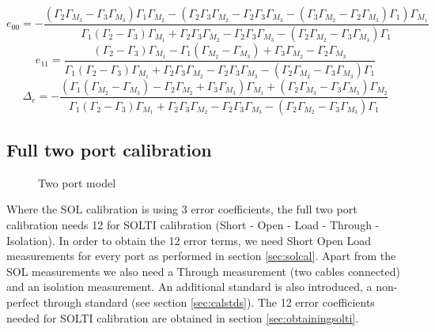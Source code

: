 	\small
	\begin{equation}
	\label{eqn:e00}
		e_{00} = -\frac{{\left(\Gamma_{2} \Gamma_{M_{3}} - \Gamma_{3} \Gamma_{M_{3}}\right)} \Gamma_{1} \Gamma_{M_{2}} - {\left(\Gamma_{2} \Gamma_{3} \Gamma_{M_{2}} - \Gamma_{2} \Gamma_{3} \Gamma_{M_{3}} - {\left(\Gamma_{3} \Gamma_{M_{2}} - \Gamma_{2} \Gamma_{M_{3}}\right)} \Gamma_{1}\right)} \Gamma_{M_{1}}}{\Gamma_{1} {\left(\Gamma_{2} - \Gamma_{3}\right)} \Gamma_{M_{1}} + \Gamma_{2} \Gamma_{3} \Gamma_{M_{2}} - \Gamma_{2} \Gamma_{3} \Gamma_{M_{3}} - {\left(\Gamma_{2} \Gamma_{M_{2}} - \Gamma_{3} \Gamma_{M_{3}}\right)} \Gamma_{1}}		
	\end{equation}
	\begin{equation}
	\label{eqn:e11}
	e_{11} = \frac{{\left(\Gamma_{2} - \Gamma_{3}\right)} \Gamma_{M_{1}} - \Gamma_{1} {\left(\Gamma_{M_{2}} - \Gamma_{M_{3}}\right)} + \Gamma_{3} \Gamma_{M_{2}} - \Gamma_{2} \Gamma_{M_{3}}}{\Gamma_{1} {\left(\Gamma_{2} - \Gamma_{3}\right)} \Gamma_{M_{1}} + \Gamma_{2} \Gamma_{3} \Gamma_{M_{2}} - \Gamma_{2} \Gamma_{3} \Gamma_{M_{3}} - {\left(\Gamma_{2} \Gamma_{M_{2}} - \Gamma_{3} \Gamma_{M_{3}}\right)} \Gamma_{1}}
	\end{equation}
	\begin{equation}
	\label{eqn:deltae}
	 \Delta_{e} = -\frac{{\left(\Gamma_{1} {\left(\Gamma_{M_{2}} - \Gamma_{M_{3}}\right)} - \Gamma_{2} \Gamma_{M_{2}} + \Gamma_{3} \Gamma_{M_{3}}\right)} \Gamma_{M_{1}} + {\left(\Gamma_{2} \Gamma_{M_{3}} - \Gamma_{3} \Gamma_{M_{3}}\right)} \Gamma_{M_{2}}}{\Gamma_{1} {\left(\Gamma_{2} - \Gamma_{3}\right)} \Gamma_{M_{1}} + \Gamma_{2} \Gamma_{3} \Gamma_{M_{2}} - \Gamma_{2} \Gamma_{3} \Gamma_{M_{3}} - {\left(\Gamma_{2} \Gamma_{M_{2}} - \Gamma_{3} \Gamma_{M_{3}}\right)} \Gamma_{1}}
	\end{equation}
	\normalsize
	
\newpage
\subsection{Full two port calibration}
\label{sec:soltical}
\begin{figure}[H]
	\centering
	
	\caption{Two port model}
	\label{fig:twoportmodel}
\end{figure}

Where the SOL calibration is using 3 error coefficients, the full two port calibration needs 12 for SOLTI calibration (Short - Open - Load - Through - Isolation). In order to obtain the 12 error terms, we need Short Open Load measurements for every port as performed in section \ref{sec:solcal}. Apart from the SOL measurements we also need a Through measurement (two cables connected) and an isolation measurement. An additional standard is also introduced, a non-perfect through standard (see section \ref{sec:calstds}). The 12 error coefficients needed for SOLTI calibration are obtained in section \ref{sec:obtainingsolti}.

